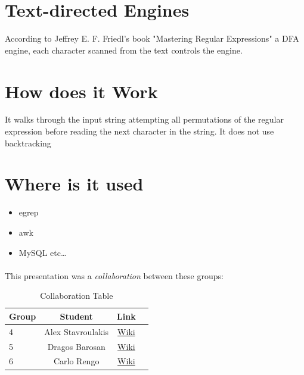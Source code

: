 \documentclass[a4paper,11pt]{report}
\begin{document}
\section{Text-directed Engines}
\begin{center}
According to Jeffrey E. F. Friedl’s book "Mastering Regular Expressions" a DFA engine, each character scanned from the text controls the engine. \cite{book}
\end{center}

\section{How does it Work}
\begin{flushright}
It walks through the input string attempting all permutations of the regular expression before reading the next character in the string. It does not use backtracking
\end{flushright}

\section{Where is it used}
\begin{itemize}
  \item egrep
  \item awk
  \item MySQL etc\ldots
\end{itemize}

\paragraph{}
This presentation was a \emph{collaboration} between these groups: \\

\begin{table}[h]
\centering
 \begin{tabular}{| l | c | c | c |}
 \hline \textbf{Group} & \textbf{Student} & \textbf{Link} \\
 \hline 
 4 & Alex Stavroulakis & \href{https://www.os3.nl/2014-2015/students/alexandros_stavroulakis/es}{Wiki}\\
 \hline 
 5 & Dragos Barosan & \href{https://www.os3.nl/2014-2015/students/dragos_barosan/es/week2#homework_3}{Wiki} \\ 
 \hline 
 6 & Carlo Rengo & \href{https://www.os3.nl/2014-2015/students/carlo_rengo/es/homewrk_3}{Wiki} \\ 
 \hline 
 \end{tabular} 
 \caption[Collaboration Table]{Collaboration Table}
\end{table}
\end{document}
